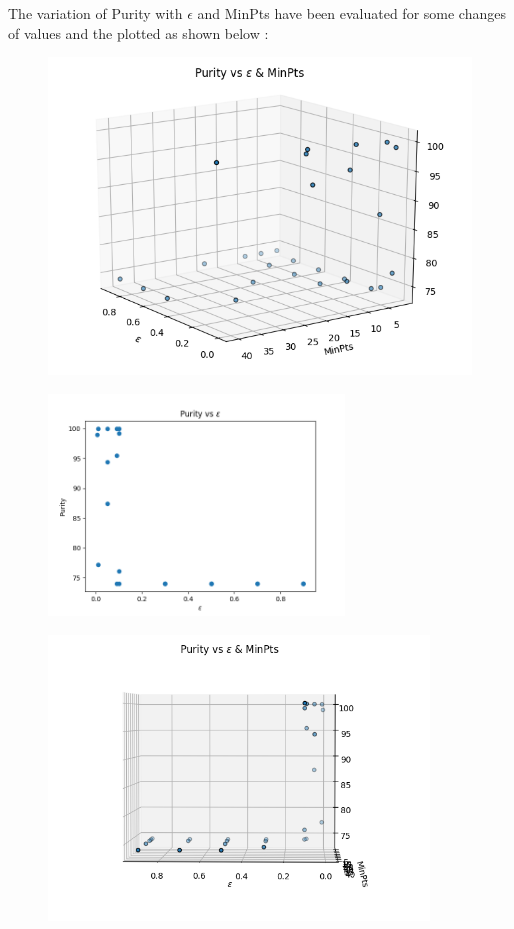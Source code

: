 \documentclass[paper=a4, fontsize=11pt]{scrartcl}
\numberwithin{equation}{section}		%
\numberwithin{figure}{section}			%
\numberwithin{table}{section}				%
\begin{document}
The variation of Purity with $\epsilon$ and MinPts have been evaluated for some changes of values and the plotted as shown below :
\begin{figure}[H]
\begin{center}
\includegraphics[scale=0.9]{dbscan_1}
\end{center}
\end{figure}

\begin{figure}[H]
	\centering
  \includegraphics[width=0.7\textwidth]{dbscan_2}\label{fig:f2}
\end{figure}

\begin{figure}[H]
	\centering
  \includegraphics[width=0.9\textwidth]{dbscan_4}\label{fig:f2}
\end{figure}
\end{document}
